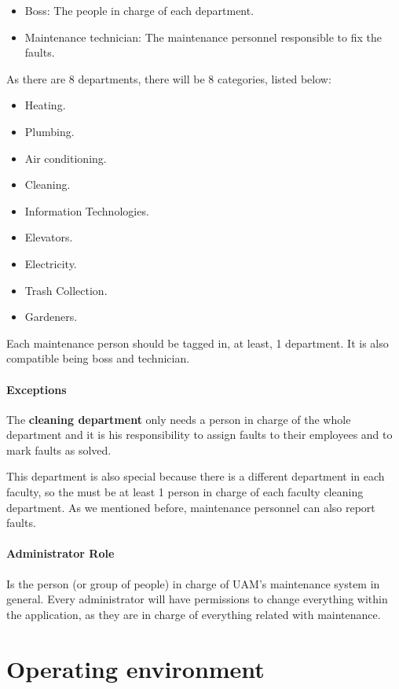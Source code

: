 \begin{itemize}
\item Boss: The people in charge of each department.
\item Maintenance technician: The maintenance personnel responsible to fix the faults.
\end{itemize}

As there are 8 departments, there will be 8 categories, listed below:

\begin{itemize}
\item Heating.
\item Plumbing.
\item Air conditioning.
\item Cleaning.
\item Information Technologies.
\item Elevators.
\item Electricity.
\item Trash Collection.
\item Gardeners.
\end{itemize}

Each maintenance person should be tagged in, at least, 1 department. It is also compatible being boss and technician.

\paragraph{Exceptions} The \textbf{cleaning department} only needs a person in charge of the whole department and it is his responsibility to assign faults to their employees and to mark faults as solved.

This department is also special because there is a different department in each faculty, so the must be at least 1 person in charge of each faculty cleaning department. As we mentioned before, maintenance personnel can also report faults.

\paragraph{Administrator Role} Is the person (or group of people) in charge of UAM's maintenance system in general. Every administrator will have permissions to change everything within the application, as they are in charge of everything related with maintenance.

\section{Operating environment}

